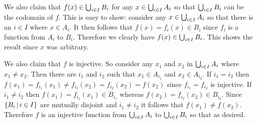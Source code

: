 {{    We also claim that $f(x) \in \bigcup_{i \in I} B_i$ for any $x \in \bigcup_{i \in I} A_i$ so that $\bigcup_{i \in I} B_i$ can be the codomain of $f$.
    This is easy to show: consider any $x \in \bigcup_{i \in I} A_i$ so that there is an $i \in I$ where $x \in A_i$.
    It then follows that $f(x) = f_i(x) \in B_i$ since $f_i$ is a function from $A_i$ to $B_i$.
    Therefore we clearly have $f(x) \in \bigcup_{i \in I} B_i$.
    This shows the result since $x$ was arbitrary.

    We also claim that $f$ is injective.
    So consider any $x_1$ and $x_2$ in $\bigcup_{i \in I} A_i$ where $x_1 \neq x_2$.
    Then there are $i_1$ and $i_2$ such that $x_1 \in A_{i_1}$ and $x_2 \in A_{i_2}$.
    If $i_1 = i_2$ then $f(x_1) = f_{i_1}(x_1) \neq f_{i_1}(x_2) = f_{i_2}(x_2) = f(x_2)$ since $f_{i_1} = f_{i_2}$ is injective.
    If $i_1 \neq i_2$ then $f(x_1) = f_{i_1}(x_1) \in B_{i_1}$ whereas $f(x_2) = f_{i_2}(x_2) \in B_{i_2}$.
    Since $\left\{ B_i \,|\, i \in I \right\}$ are mutually disjoint and $i_1 \neq i_2$ it follows that $f(x_1) \neq f(x_2)$.
    Therefore $f$ is an injective function from $\bigcup_{i \in I} A_i$ to $\bigcup_{i \in I} B_i$ so that
    as desired.
  }
}
